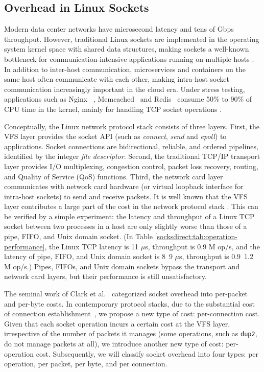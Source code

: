 \subsection{Overhead in Linux Sockets}
\label{socksdirect:subsec:motivation}

Modern data center networks have microsecond latency and tens of Gbps throughput. However, traditional Linux sockets are implemented in the operating system kernel space with shared data structures, making sockets a well-known bottleneck for communication-intensive applications running on multiple hosts \cite {barroso2017attack}. In addition to inter-host communication, microservices and containers on the same host often communicate with each other, making intra-host socket communication increasingly important in the cloud era. Under stress testing, applications such as Nginx~ \cite {reese2008nginx}, Memcached~ \cite {fitzpatrick2004distributed} and Redis~ \cite {carlson2013redis} consume 50\% to 90\% of CPU time in the kernel, mainly for handling TCP socket operations \cite{jeong2014mtcp}.

Conceptually, the Linux network protocol stack consists of three layers. First, the VFS layer provides the socket API (such as \emph {connect}, \emph {send} and \emph {epoll}) to applications. Socket connections are bidirectional, reliable, and ordered pipelines, identified by the integer \emph {file descriptor}.
Second, the traditional TCP/IP transport layer provides I/O multiplexing, congestion control, packet loss recovery, routing, and Quality of Service (QoS) functions.
Third, the network card layer communicates with network card hardware (or virtual loopback interface for intra-host sockets) to send and receive packets.
It is well known that the VFS layer contributes a large part of the cost in the network protocol stack \cite {clark1989analysis,boyd2010analysis}.
This can be verified by a simple experiment: the latency and throughput of a Linux TCP socket between two processes in a host are only slightly worse than those of a pipe, FIFO, and Unix domain socket. (In Table \ref {socksdirect:tab:operation-performance}, the Linux TCP latency is 11 $\mu$s, throughput is 0.9 M op/s, and the latency of pipe, FIFO, and Unix domain socket is 8~9 $\mu$s, throughput is 0.9~1.2 M op/s.)
Pipes, FIFOs, and Unix domain sockets bypass the transport and network card layers, but their performance is still unsatisfactory.

The seminal work of Clark et al.~\cite{clark1989analysis} categorized socket overhead into per-packet and per-byte costs. In contemporary protocol stacks, due to the substantial cost of connection establishment~\cite{jeong2014mtcp,lin2016scalable}, we propose a new type of cost: per-connection cost. Given that each socket operation incurs a certain cost at the VFS layer, irrespective of the number of packets it manages (some operations, such as \texttt{dup2}, do not manage packets at all), we introduce another new type of cost: per-operation cost.
Subsequently, we will classify socket overhead into four types: per operation, per packet, per byte, and per connection.

